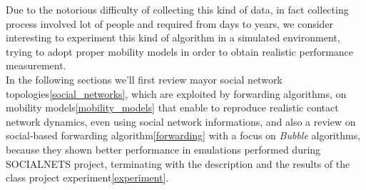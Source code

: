 Due to the notorious difficulty of collecting this kind of data, in fact collecting process involved lot of people and required from days to years, we consider interesting to experiment this kind of algorithm in a simulated environment, trying to adopt proper mobility models in order to obtain realistic performance measurement.\\
In the following sections we'll first review mayor social network topologies\ref{social_networks}, which are exploited by forwarding algorithms, on mobility models\ref{mobility_models} that enable to reproduce realistic contact network dynamics, even using social network informations, and also a review on social-based forwarding algorithm\ref{forwarding} with a focus on \emph{Bubble} algorithms\cite{bubble}, because they shown better performance in emulations performed during SOCIALNETS project, terminating with the description and the results of the class project experiment\ref{experiment}. \\ 

